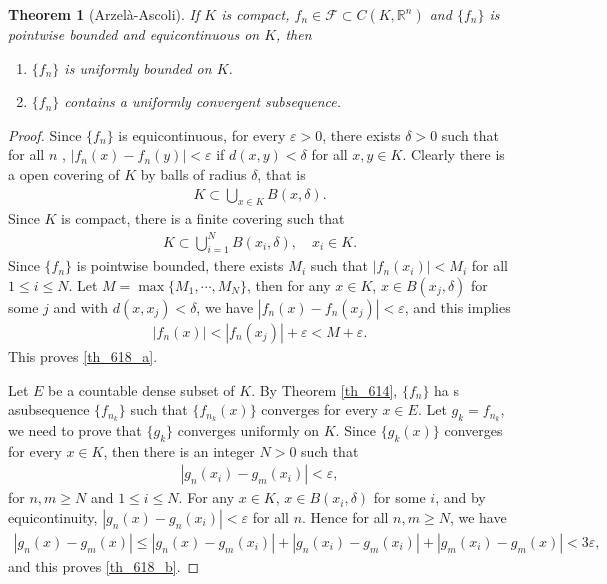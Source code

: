 \documentclass[11pt]{book}
\newtheorem{theorem}{Theorem}[chapter]
\theoremstyle{definition}
\numberwithin{equation}{chapter}
\begin{document}
\begin{theorem}[Arzelà-Ascoli]\label{th_618}
If $K$ is compact, $f_n \in \mathcal{F} \subset C(K,\mathbb{R}^n)$ and $\{f_n\}$ is pointwise bounded and equicontinuous on $K$, then
\begin{enumerate}[label=(\alph*)]
    \item $\{f_n\}$ is uniformly bounded on $K$. \label{th_618_a}
    
    \item $\{f_n\}$ contains a uniformly convergent subsequence. \label{th_618_b}
\end{enumerate}
\end{theorem}
\begin{proof}
Since $\{f_n\}$ is equicontinuous, for every $\varepsilon > 0$, there exists $\delta > 0$ such that for all $n$ , $\left|f_n(x) - f_n(y)\right| < \varepsilon$ if $d(x,y) < \delta$ for all $x,y \in K$. Clearly there is a open covering of $K$ by balls of radius $\delta$, that is
\begin{align*}
    K \subset \bigcup_{x \in K} B(x,\delta).
\end{align*}
Since $K$ is compact, there is a finite covering such that
\begin{align*}
    K \subset \bigcup^N_{i=1} B(x_i,\delta), \quad x_i \in K.
\end{align*}
Since $\{f_n\}$ is pointwise bounded, there exists $M_i$ such that $\left|f_n(x_i)\right| < M_i$ for all $1 \leq i \leq N$. Let $M = \max \{M_1, \cdots, M_N\}$, then for any $x \in K$, $x \in B(x_j,\delta)$ for some $j$ and with $d(x,x_j) < \delta$, we have $\left|f_n(x) - f_n(x_j)\right| < \varepsilon$, and this implies
\begin{align*}
    \left|f_n(x)\right| < \left|f_n(x_j)\right| + \varepsilon < M + \varepsilon.
\end{align*}
This proves \ref{th_618_a}.

Let $E$ be a countable dense subset of $K$. By Theorem \ref{th_614}, $\{f_n\}$ ha s asubsequence $\{f_{n_k}\}$ such that $\{f_{n_k}(x)\}$ converges for every $x \in E$. Let $g_k = f_{n_k}$, we need to prove that $\{g_k\}$ converges uniformly on $K$. Since $\{g_k(x)\}$ converges for every $x \in K$, then there is an integer $N > 0$ such that
\begin{align*}
    \left|g_n(x_i) - g_m(x_i)\right| < \varepsilon,
\end{align*}
for $n,m \geq N$ and $1 \leq i \leq N$. For any $x \in K$, $x \in B(x_i,\delta)$ for some $i$, and by equicontinuity, $\left|g_n(x) - g_n(x_i)\right| < \varepsilon$ for all $n$. Hence for all $n,m \geq N$, we have
\begin{align*}
    \left|g_n(x) - g_m(x)\right| \leq \left|g_n(x) - g_m(x_i)\right| + \left|g_n(x_i) - g_m(x_i)\right| + \left|g_m(x_i) - g_m(x)\right| < 3 \varepsilon,
\end{align*}
and this proves \ref{th_618_b}.
\end{proof}
\end{document}
